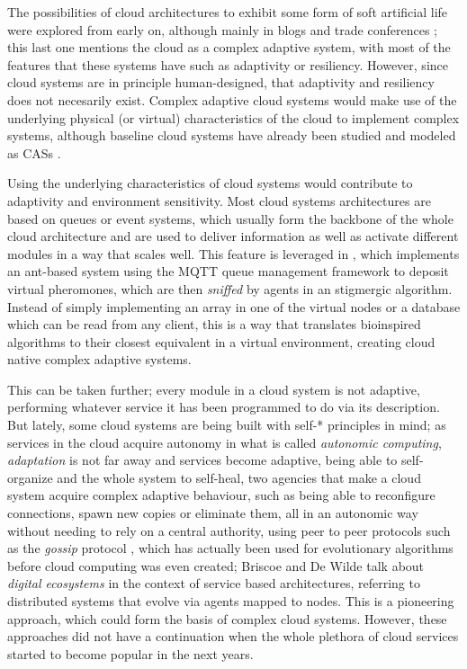 \documentclass[utf8]{frontiersSCNS} %
\begin{document}
The possibilities of cloud architectures to exhibit some form of soft
artificial life were explored from early on, although mainly in blogs
and trade conferences \citep{burela09:Azure,hakimi}; this last one
mentions the cloud as a complex adaptive system, with most of the
features that these systems have such as adaptivity or
resiliency.
However, since cloud systems are in principle
human-designed, that adaptivity and resiliency does not necesarily
exist. Complex adaptive cloud systems would make use of the underlying physical (or
virtual) characteristics of the cloud to implement complex
systems, although baseline cloud systems have already been studied and
modeled as CASs \citep{chen2013cloud}.

Using the underlying characteristics of cloud systems would
contribute to adaptivity and environment sensitivity.
Most cloud systems architectures are based on queues or event systems, which
usually form the backbone of the whole cloud architecture and are used to deliver
information as well as activate different modules in a way that scales
well. This feature is leveraged in \citep{bottone2016implementing}, which
implements an ant-based system using the MQTT queue management
framework to deposit virtual pheromones, which are then {\em sniffed} by
agents in an stigmergic algorithm. Instead of simply implementing an
array in one of the virtual nodes or a database which can be read from
any client, this is a way that translates bioinspired algorithms to
their closest equivalent in a virtual environment, creating cloud
native complex adaptive systems.

This can be taken further; every module in a cloud system is not
adaptive, performing whatever service it has been programmed to do via
its description. But lately, some cloud systems are being built with
self-* principles in mind; as services in the cloud acquire autonomy
in what is called {\em autonomic computing}, {\em adaptation} is not far away
and services become adaptive, being able to self-organize and the
whole system to self-heal, two agencies that make a cloud system
acquire complex adaptive behaviour, such as being able to reconfigure
connections, spawn new copies or eliminate them, all in an autonomic
way without needing to rely on a central authority, using peer to peer
protocols such as the {\em gossip} protocol \citep{LNCS44480129}, which has
actually been used for evolutionary algorithms \citep{laredo09cache} before
cloud computing was even created;  Briscoe and De Wilde
\citep{DBLP:journals/corr/abs-1101-5428,DBLP:journals/corr/abs-0712-4102}
  talk about {\em digital ecosystems} in the context of service based
  architectures, referring to distributed systems that evolve via
  agents mapped to nodes. This is a pioneering approach, which could
  form the basis of complex cloud systems. However, these approaches
  did not have a continuation when the whole plethora of cloud
  services started to become popular in the next years.
\end{document}
